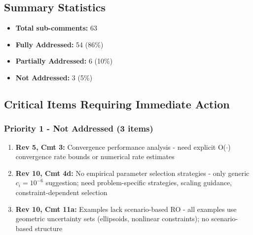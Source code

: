 \documentclass[journal,twoside,web]{ieeecolor}
\begin{document}
\begin{longtable}{|c|c|p{5.5cm}|c|p{3.5cm}|}
\end{longtable}

\subsection*{Summary Statistics}
\begin{itemize}
\item \textbf{Total sub-comments:} 63
\item \textbf{Fully Addressed:} 54 (86\%)
\item \textbf{Partially Addressed:} 6 (10\%)
\item \textbf{Not Addressed:} 3 (5\%)
\end{itemize}

\subsection*{Critical Items Requiring Immediate Action}

\subsubsection*{Priority 1 - Not Addressed (3 items)}
\begin{enumerate}
\item \textbf{Rev 5, Cmt 3:} Convergence performance analysis - need explicit O($\cdot$) convergence rate bounds or numerical rate estimates
\item \textbf{Rev 10, Cmt 4d:} No empirical parameter selection strategies - only generic $c_i=10^{-6}$ suggestion; need problem-specific strategies, scaling guidance, constraint-dependent selection
\item \textbf{Rev 10, Cmt 11a:} Examples lack scenario-based RO - all examples use geometric uncertainty sets (ellipsoids, nonlinear constraints); no scenario-based structure
\end{enumerate}
\end{document}
